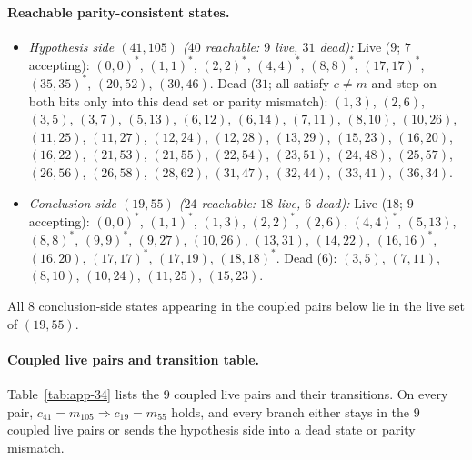 \documentclass[11pt]{article}
\begin{document}
\paragraph{Reachable parity-consistent states.}
\begin{itemize}
  \item \emph{Hypothesis side $(41,105)$ ($40$ reachable: $9$ live, $31$ dead):}
  Live ($9$; $7$ accepting): $(0,0)^*$, $(1,1)^*$, $(2,2)^*$, $(4,4)^*$, $(8,8)^*$, $(17,17)^*$, $(35,35)^*$, $(20,52)$, $(30,46)$.
  Dead ($31$; all satisfy $c \ne m$ and step on both bits only into this dead set or parity mismatch):
  $(1,3)$, $(2,6)$, $(3,5)$, $(3,7)$, $(5,13)$, $(6,12)$, $(6,14)$, $(7,11)$, $(8,10)$, $(10,26)$, $(11,25)$, $(11,27)$, $(12,24)$, $(12,28)$, $(13,29)$, $(15,23)$, $(16,20)$, $(16,22)$, $(21,53)$, $(21,55)$, $(22,54)$, $(23,51)$, $(24,48)$, $(25,57)$, $(26,56)$, $(26,58)$, $(28,62)$, $(31,47)$, $(32,44)$, $(33,41)$, $(36,34)$.
  \item \emph{Conclusion side $(19,55)$ ($24$ reachable: $18$ live, $6$ dead):}
  Live ($18$; $9$ accepting): $(0,0)^*$, $(1,1)^*$, $(1,3)$, $(2,2)^*$, $(2,6)$, $(4,4)^*$, $(5,13)$, $(8,8)^*$, $(9,9)^*$, $(9,27)$, $(10,26)$, $(13,31)$, $(14,22)$, $(16,16)^*$, $(16,20)$, $(17,17)^*$, $(17,19)$, $(18,18)^*$.
  Dead ($6$): $(3,5)$, $(7,11)$, $(8,10)$, $(10,24)$, $(11,25)$, $(15,23)$.
\end{itemize}
All $8$ conclusion-side states appearing in the coupled pairs below lie in the live set of $(19,55)$.

\paragraph{Coupled live pairs and transition table.}
Table~\ref{tab:app-34} lists the $9$ coupled live pairs and their transitions. On every pair, $c_{41} = m_{105} \Rightarrow c_{19} = m_{55}$ holds, and every branch either stays in the $9$ coupled live pairs or sends the hypothesis side into a dead state or parity mismatch.
\end{document}

